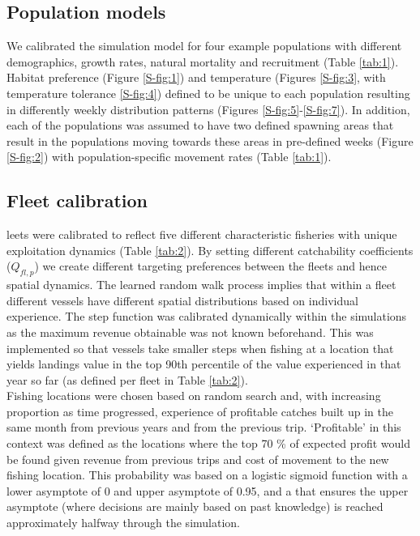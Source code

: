\documentclass[review]{elsarticle}
\begin{document}
\subsection{Population models}

We calibrated the simulation model for four example populations with different
demographics, growth rates, natural mortality and recruitment (Table
\ref{tab:1}). Habitat preference (Figure \ref{S-fig:1}) and temperature
(Figures \ref{S-fig:3}, with temperature tolerance \ref{S-fig:4}) defined to be
unique to each population resulting in differently weekly distribution patterns
(Figures \ref{S-fig:5}-\ref{S-fig:7}). In addition, each of the populations was
assumed to have two defined spawning areas that result in the populations
moving towards these areas in pre-defined weeks (Figure \ref{S-fig:2}) with
population-specific movement rates (Table \ref{tab:1}).  

\subsection{Fleet calibration}

leets were calibrated to reflect five different characteristic fisheries
with unique exploitation dynamics (Table \ref{tab:2}). By setting different
catchability coefficients ($Q_{fl, p}$) we create different targeting
preferences between the fleets and hence  spatial dynamics.  The learned random
walk process implies that within a fleet different vessels have different
spatial distributions based on individual experience. The step function was
calibrated dynamically within the simulations as the maximum revenue
obtainable was not known beforehand. This was implemented so that vessels take
smaller steps when fishing at a location that yields landings value in the top
90th percentile of the value experienced in that year so far (as defined per
fleet in Table \ref{tab:2}). \\

Fishing locations were chosen based on random search and, with increasing
proportion as time progressed, experience of profitable catches built up in the
same month from previous years and from the previous trip.  `Profitable' in
this context was defined as the locations where the top 70 \% of expected
profit would be found given revenue from previous trips and cost of movement to
the new fishing location. This probability was based on a logistic sigmoid
function with a lower asymptote of 0 and upper asymptote of 0.95, and a  that ensures the upper asymptote (where decisions are mainly based on past
knowledge) is reached approximately halfway through the simulation.  \\
\end{document}
